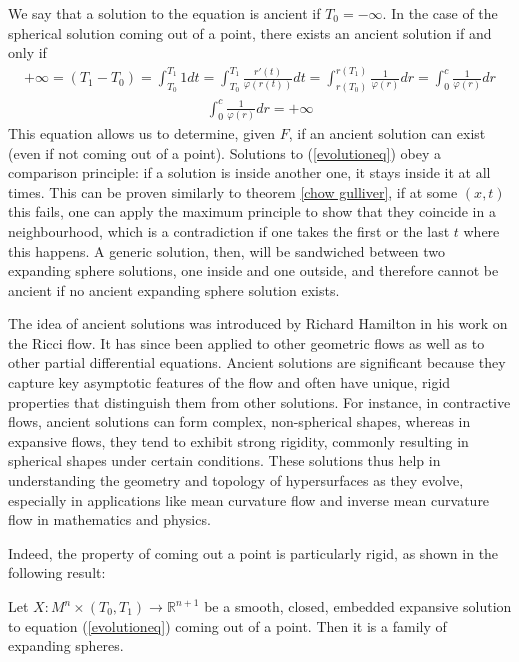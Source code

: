 We say that a solution to the equation is ancient if $T_0=-\infty$. 
In the case of the spherical solution coming out of a point, there exists an ancient solution if and only if
\begin{align*}
	+\infty=(T_1-T_0)=\int_{T_0}^{T_1} 1 dt = \int_{T_0}^{T_1}\frac{r'(t)}{\varphi(r(t))} dt = \int_{r(T_0)}^{r(T_1)}\frac{1}{\varphi(r)} dr = \int_{0}^{c}\frac{1}{\varphi(r)} dr
\end{align*}
\begin{align*}
	\int_{0}^{c}\frac{1}{\varphi(r)} dr =+\infty
\end{align*}
This equation allows us to determine, given $F$, if an ancient solution can exist (even if not coming out of a point). Solutions to (\ref{evolutioneq}) obey a comparison principle: if a solution is inside another one, it stays inside it at all times. This can be proven similarly to theorem \ref{chow gulliver}, if at some $(x, t)$ this fails, one can apply the maximum principle to show that they coincide in a neighbourhood, which is a contradiction if one takes the first or the last $t$ where this happens. A generic solution, then, will be sandwiched between two expanding sphere solutions, one inside and one outside, and therefore cannot be ancient if no ancient expanding sphere solution exists. 


The idea of ancient solutions was introduced by Richard Hamilton in his work on the Ricci flow. It has since been applied to other geometric flows as well as to other partial differential equations. Ancient solutions are significant because they capture key asymptotic features of the flow and often have unique, rigid properties that distinguish them from other solutions. For instance, in contractive flows, ancient solutions can form complex, non-spherical shapes, whereas in expansive flows, they tend to exhibit strong rigidity, commonly resulting in spherical shapes under certain conditions. These solutions thus help in understanding the geometry and topology of hypersurfaces as they evolve, especially in applications like mean curvature flow and inverse mean curvature flow in mathematics and physics.


Indeed, the property of coming out a point is particularly rigid, as shown in the following result:

\begin{theorem}
	Let $ X : M^n \times (T_0, T_1) \to \mathbb{R}^{n+1} $ be a smooth, closed, embedded expansive solution to equation (\ref{evolutioneq}) coming out of a point. Then it is a family of expanding spheres.\label{pointexpanding}
\end{theorem}

